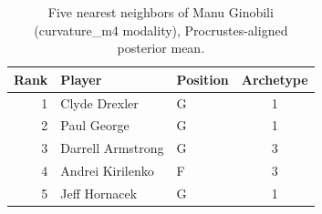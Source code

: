 \begin{table}[htbp]
  \centering\small
  \begin{tabular}{rllc}
    \toprule
    Rank & Player & Position & Archetype \\
    \midrule
    1 & Clyde Drexler & G & 1 \\
    2 & Paul George & G & 1 \\
    3 & Darrell Armstrong & G & 3 \\
    4 & Andrei Kirilenko & F & 3 \\
    5 & Jeff Hornacek & G & 1 \\
    \bottomrule
  \end{tabular}
  \caption{Five nearest neighbors of Manu Ginobili (curvature_m4 modality), Procrustes-aligned posterior mean.}
  \label{tab:Manu_Ginobili_neighbors_curvature_m4}
\end{table}

